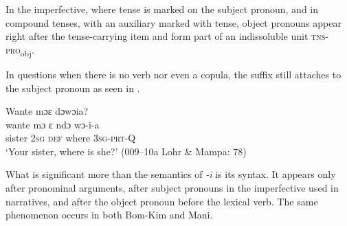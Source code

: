 In the imperfective, where tense is marked on the subject pronoun, and in compound tenses, with an auxiliary marked with tense, object pronouns appear right after the tense-carrying item and form part of an indissoluble unit \textsc{tns}\nobreakdash-\textsc{pro}\textsubscript{obj}.

In questions when there is no verb nor even a copula, the suffix still attaches to the subject pronoun as seen in .

\ea%
    \label{ex:207}
    Wante mɔɛ dɔwɔia?\\
    \gll wante    mɔ  ɛ    ndɔ    wɔ-i-a\\
    sister    \textsc{2sg}  \textsc{def}  where  \textsc{3sg-prt}{}-Q\\
‎    \glt ‘Your sister, where is she?' (009--10a Lohr \& Mampa: 78)
\z

What is significant more than the semantics of \textit{{}-i} is its syntax. It appears only after pronominal arguments, after subject pronouns in the imperfective used in narratives, and after the object pronoun before the lexical verb. The same phenomenon occurs in both Bom-Kim and Mani.

